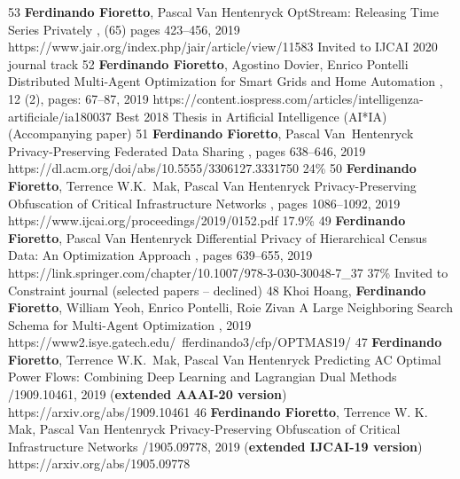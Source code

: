 \begin{pubs}
\journalentryAwd
	{53}	%
	{{\bf Ferdinando Fioretto}, Pascal Van Hentenryck}
	{OptStream: Releasing Time Series Privately}
	{\JAIR, (65) pages 423--456, 2019}
	{https://www.jair.org/index.php/jair/article/view/11583}
	{Invited to IJCAI 2020 journal track}
	{}
\journalentryAwd
	{52}	%
	{{\bf Ferdinando Fioretto}, Agostino Dovier, Enrico Pontelli}
	{Distributed Multi-Agent Optimization for Smart Grids and Home Automation}
	{,  12 (2), pages: 67--87, 2019}
	{https://content.iospress.com/articles/intelligenza-artificiale/ia180037}
	{Best 2018 Thesis in Artificial Intelligence (AI*IA)}
	{(Accompanying paper)}
\confentry
	{51} %
	{{\bf Ferdinando Fioretto}, Pascal Van~Hentenryck}
	{Privacy-Preserving Federated Data Sharing}
  	{\procAAMAS, pages 638--646, 2019}
  	{https://dl.acm.org/doi/abs/10.5555/3306127.3331750}
	{24\%} %
\confentry
	{50} %
	{{\bf Ferdinando Fioretto}, Terrence W.K.~Mak, Pascal Van Hentenryck}
	{Privacy-Preserving Obfuscation of Critical Infrastructure Networks}
  	{\procIJCAI, pages 1086--1092, 2019}
  	{https://www.ijcai.org/proceedings/2019/0152.pdf}
    {17.9\%} %
\confentryAwd
	{49} %
	{{\bf Ferdinando Fioretto}, Pascal Van Hentenryck}
	{Differential Privacy of Hierarchical Census Data: An Optimization Approach} 
	{\procCP, pages 639--655, 2019}
	{https://link.springer.com/chapter/10.1007/978-3-030-30048-7\_37}
	{37\%}
	{Invited to Constraint journal}
	{(selected papers -- declined)}
\wsentry 
	{48} %
	{Khoi Hoang, {\bf Ferdinando Fioretto}, William Yeoh, Enrico Pontelli, Roie Zivan}
	{A Large Neighboring Search Schema for Multi-Agent Optimization} 
	{, 2019}
	{https://www2.isye.gatech.edu/~fferdinando3/cfp/OPTMAS19/}
\wsentry
	{47}%
	{{\bf Ferdinando Fioretto}, Terrence W.K.~Mak, Pascal Van Hentenryck}
	{Predicting AC Optimal Power Flows: Combining Deep Learning and Lagrangian Dual Methods}
	{/1909.10461, 2019 ({\bf extended AAAI-20 version})}
	{https://arxiv.org/abs/1909.10461}
\wsentry
	{46}%
	{{\bf Ferdinando Fioretto}, Terrence W. K. Mak, Pascal Van Hentenryck}
	{Privacy-Preserving Obfuscation of Critical Infrastructure Networks} 
	{/1905.09778, 2019 ({\bf extended IJCAI-19 version})}
	{https://arxiv.org/abs/1905.09778}



\end{pubs}
